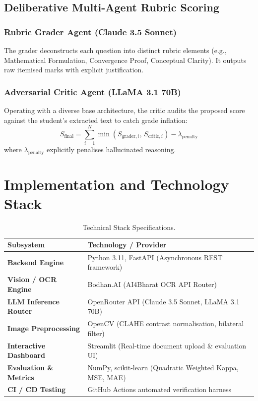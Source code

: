 \documentclass[11pt,a4paper]{article}
\begin{document}
\subsection{Deliberative Multi-Agent Rubric Scoring}
\subsubsection{Rubric Grader Agent (Claude 3.5 Sonnet)}
The grader deconstructs each question into distinct rubric elements (e.g., Mathematical Formulation, Convergence Proof, Conceptual Clarity). It outputs raw itemised marks with explicit justification.

\subsubsection{Adversarial Critic Agent (LLaMA 3.1 70B)}
Operating with a diverse base architecture, the critic audits the proposed score against the student's extracted text to catch grade inflation:
\begin{equation}
    S_{\text{final}} = \sum_{i=1}^N \min\left(S_{\text{grader}, i}, \, S_{\text{critic}, i}\right) - \lambda_{\text{penalty}}
\end{equation}
where $\lambda_{\text{penalty}}$ explicitly penalises hallucinated reasoning.

\newpage
\section{Implementation and Technology Stack}

\begin{table}[htbp]
    \centering
    \caption{Technical Stack Specifications.}
    \label{tab:tech-stack}
    \renewcommand{\arraystretch}{1.35}
    \begin{tabularx}{\textwidth}{>{\bfseries\RaggedRight\arraybackslash}p{} >{\RaggedRight\arraybackslash}X}
    \toprule
    \textbf{Subsystem} & \textbf{Technology / Provider} \\
    \midrule
    Backend Engine & Python 3.11, FastAPI (Asynchronous REST framework) \\
    Vision / OCR Engine & Bodhan.AI (AI4Bharat OCR API Router) \\
    LLM Inference Router & OpenRouter API (Claude 3.5 Sonnet, LLaMA 3.1 70B) \\
    Image Preprocessing & OpenCV (CLAHE contrast normalisation, bilateral filter) \\
    Interactive Dashboard & Streamlit (Real-time document upload \& evaluation UI) \\
    Evaluation \& Metrics & NumPy, scikit-learn (Quadratic Weighted Kappa, MSE, MAE) \\
    CI / CD Testing & GitHub Actions automated verification harness \\
    \bottomrule
    \end{tabularx}
\end{table}
\end{document}
